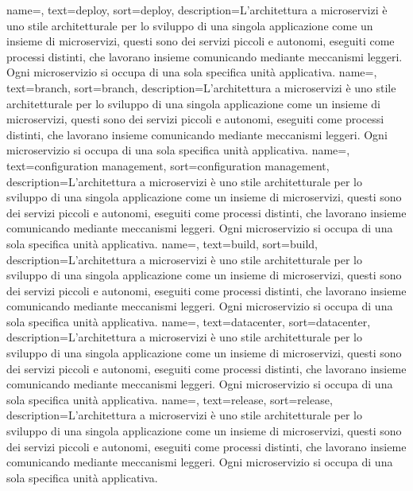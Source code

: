 {
	name=,
	text=deploy,
	sort=deploy,
	description={L'architettura a microservizi è uno stile architetturale per lo sviluppo di una singola applicazione come un insieme di microservizi, questi sono dei servizi piccoli e autonomi, eseguiti come	processi distinti, che lavorano insieme comunicando mediante meccanismi leggeri. Ogni microservizio si occupa di una sola specifica unità applicativa.}
}
{
	name=,
	text=branch,
	sort=branch,
	description={L'architettura a microservizi è uno stile architetturale per lo sviluppo di una singola applicazione come un insieme di microservizi, questi sono dei servizi piccoli e autonomi, eseguiti come	processi distinti, che lavorano insieme comunicando mediante meccanismi leggeri. Ogni microservizio si occupa di una sola specifica unità applicativa.}
}
{
	name=,
	text=configuration management,
	sort=configuration management,
	description={L'architettura a microservizi è uno stile architetturale per lo sviluppo di una singola applicazione come un insieme di microservizi, questi sono dei servizi piccoli e autonomi, eseguiti come	processi distinti, che lavorano insieme comunicando mediante meccanismi leggeri. Ogni microservizio si occupa di una sola specifica unità applicativa.}
}
{
	name=,
	text=build,
	sort=build,
	description={L'architettura a microservizi è uno stile architetturale per lo sviluppo di una singola applicazione come un insieme di microservizi, questi sono dei servizi piccoli e autonomi, eseguiti come	processi distinti, che lavorano insieme comunicando mediante meccanismi leggeri. Ogni microservizio si occupa di una sola specifica unità applicativa.}
}
{
	name=,
	text=datacenter,
	sort=datacenter,
	description={L'architettura a microservizi è uno stile architetturale per lo sviluppo di una singola applicazione come un insieme di microservizi, questi sono dei servizi piccoli e autonomi, eseguiti come	processi distinti, che lavorano insieme comunicando mediante meccanismi leggeri. Ogni microservizio si occupa di una sola specifica unità applicativa.}
}
{
	name=,
	text=release,
	sort=release,
	description={L'architettura a microservizi è uno stile architetturale per lo sviluppo di una singola applicazione come un insieme di microservizi, questi sono dei servizi piccoli e autonomi, eseguiti come	processi distinti, che lavorano insieme comunicando mediante meccanismi leggeri. Ogni microservizio si occupa di una sola specifica unità applicativa.}
}
